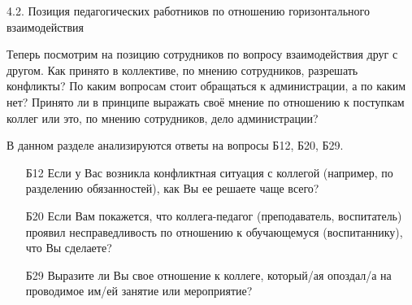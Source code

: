 \begin{frame}{4.2. Позиция педагогических работников по отношению горизонтального взаимодействия}

\tiny
Теперь посмотрим на позицию сотрудников по вопросу взаимодействия друг с другом. Как принято в коллективе, по мнению сотрудников, разрешать конфликты? По каким вопросам стоит обращаться к администрации, а по каким нет? Принято ли в принципе выражать своё мнение по отношению к поступкам коллег или это, по мнению сотрудников, дело администрации?
\bigskip

В данном разделе анализируются ответы на вопросы Б12, Б20, Б29.
\bigskip

\begin{itemize}

\item [Б12] Если у Вас возникла конфликтная ситуация с коллегой (например, по разделению обязанностей), как Вы ее решаете чаще всего?

\item [Б20] Если Вам покажется, что коллега-педагог (преподаватель, воспитатель) проявил несправедливость по отношению к обучающемуся (воспитаннику), что Вы сделаете?

\item [Б29] Выразите ли Вы свое отношение к коллеге, который/ая опоздал/а на проводимое им/ей занятие или мероприятие?

\end{itemize}

\end{frame}


